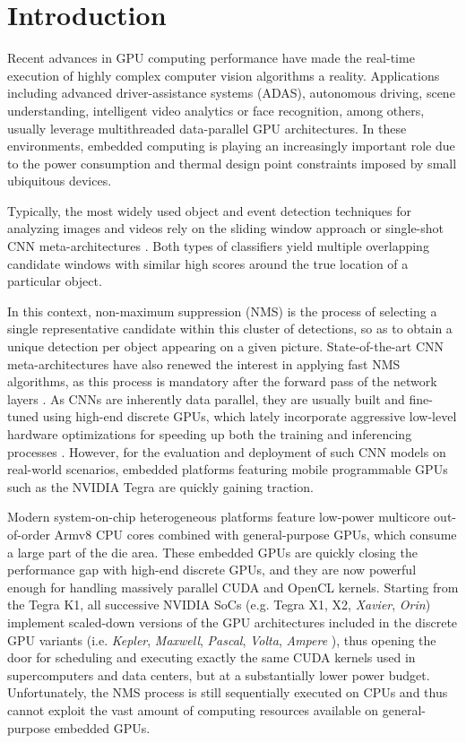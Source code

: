 \section{Introduction}

Recent advances in GPU computing performance have made the real-time execution of highly complex computer vision algorithms a reality. Applications 
including advanced driver-assistance systems (ADAS), autonomous driving, scene understanding, intelligent video analytics or face recognition, among others, 
usually leverage multithreaded data-parallel GPU architectures. In these environments, embedded computing is playing an increasingly important 
role due to the power consumption and thermal design point constraints imposed by small ubiquitous devices.

Typically, the most widely used object and event detection techniques for analyzing images and videos rely on the sliding window 
approach \cite{angelovareal,li2015convolutional} or single-shot CNN meta-architectures \cite{liu2016ssd}. Both types of classifiers yield multiple overlapping 
candidate windows with similar high scores around the true location of a particular object.

In this context, non-maximum suppression (NMS) is the process of selecting a single representative candidate within this cluster of detections, so as to obtain 
a unique detection per object appearing on a given picture. State-of-the-art CNN meta-architectures have also renewed the interest in applying fast NMS algorithms, 
as this process is mandatory after the forward pass of the network layers \cite{zhang2016joint}. As CNNs are inherently data parallel, they are usually 
built and fine-tuned using high-end discrete GPUs, which lately incorporate aggressive low-level hardware optimizations for speeding up both the training and 
inferencing processes \cite{volta18ipdps}. However, for the evaluation and deployment of such CNN models on real-world scenarios, embedded platforms featuring 
mobile programmable GPUs such as the NVIDIA Tegra \cite{nvidiaxaviersite} are quickly gaining traction.

Modern system-on-chip heterogeneous platforms feature low-power multicore out-of-order Armv8 CPU cores combined with general-purpose GPUs, which consume a large 
part of the die area. These embedded GPUs are quickly closing the performance gap with high-end discrete GPUs, and they are now powerful enough for handling 
massively parallel CUDA and OpenCL kernels. Starting from the Tegra K1, all successive NVIDIA SoCs (e.g. Tegra X1, X2,  \emph{Xavier}, \emph{Orin}) implement scaled-down 
versions of the GPU architectures included in the discrete GPU variants (i.e. \emph{Kepler}, \emph{Maxwell}, \emph{Pascal}, \emph{Volta}, \emph{Ampere} \cite{nvidiaarchs}), 
thus opening the door for scheduling and executing exactly the same CUDA kernels used in supercomputers and data centers, but at a substantially lower power budget. Unfortunately, 
the NMS process is still sequentially executed on CPUs and thus cannot exploit the vast amount of computing resources available on general-purpose embedded GPUs.

